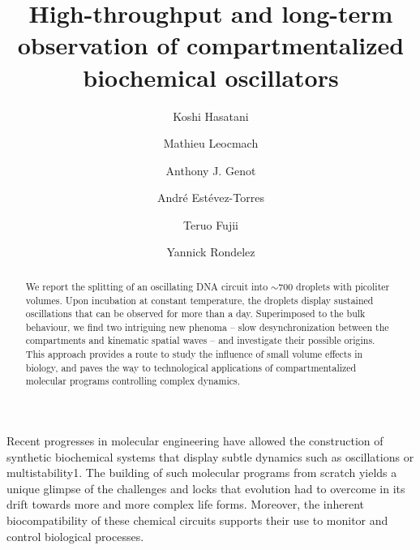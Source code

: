 \documentclass[prl,reprint, amsmath,amssymb,superscriptaddress]{revtex4-1}
\begin{document}
\title{High-throughput and long-term observation of compartmentalized biochemical oscillators}

\author{Koshi Hasatani}

\author{Mathieu Leocmach}

\author{Anthony J. Genot}

\author{André Estévez-Torres}

\author{Teruo Fujii}

\author{Yannick Rondelez}

\begin{abstract}
We report the splitting of an oscillating DNA circuit into $\sim 700$ droplets with picoliter volumes. Upon incubation at constant temperature, the droplets display sustained oscillations that can be observed for more than a day. Superimposed to the bulk behaviour, we find two intriguing new phenoma -- slow desynchronization between the compartments and kinematic spatial waves -- and investigate their possible origins. This approach provides a route to study the influence of small volume effects in biology, and paves the way to technological applications of compartmentalized molecular programs controlling complex dynamics.
\end{abstract}
\maketitle

Recent progresses in molecular engineering have allowed the construction of synthetic biochemical systems that display  subtle dynamics such as oscillations or multistability1. The building of such molecular programs from scratch yields a unique glimpse of the challenges and locks that evolution had to overcome in its drift towards more and more complex life forms. Moreover, the inherent biocompatibility of these chemical circuits supports their use to monitor and control biological processes. 
\end{document}
